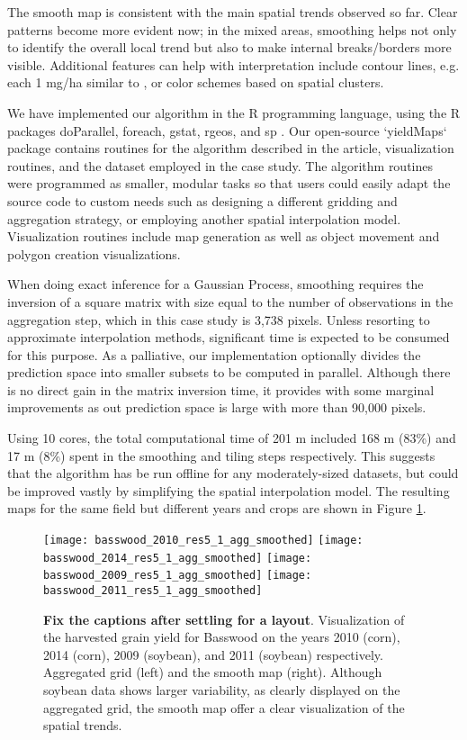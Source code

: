  The smooth map is consistent with
the main spatial trends observed so far. Clear patterns become more
evident now; in the mixed areas, smoothing helps not only to identify
the overall local trend but also to make internal breaks/borders more
visible. Additional features can help with interpretation include
contour lines, e.g. each 1 mg/ha similar to \cite{Blackmore1999}, or
color schemes based on spatial clusters.

We have implemented our algorithm in the R programming language, using
the R packages doParallel, foreach, gstat, rgeos, and sp
\citep{Pebesma2004, Pebesma2005, Bivand2013, Graeler2016,
  Microsoft2017, Corporation2018, RCT2019, Bivand2019}. Our open-source
`yieldMaps` package contains routines for the algorithm described in
the article, visualization routines, and the dataset employed in the
case study. The algorithm routines were programmed as smaller, modular
tasks so that users could easily adapt the source code to custom needs
such as designing a different gridding and aggregation strategy, or
employing another spatial interpolation model. Visualization routines
include map generation as well as object movement and polygon creation
visualizations.

When doing exact inference for a Gaussian Process, smoothing requires
the inversion of a square matrix with size equal to the number of
observations in the aggregation step, which in this case study is
3,738 pixels. Unless resorting to approximate interpolation methods,
significant time is expected to be consumed for this purpose. As a
palliative, our implementation optionally divides the prediction space
into smaller subsets to be computed in parallel. Although there is no
direct gain in the matrix inversion time, it provides with some
marginal improvements as out prediction space is large with more than
90,000 pixels.

Using 10 cores, the total computational time of 201 m included 168 m
(83\%) and 17 m (8\%) spent in the smoothing and tiling steps
respectively. This suggests that the algorithm has be run offline for
any moderately-sized datasets, but could be improved vastly by
simplifying the spatial interpolation model. The resulting maps for
the same field but different years and crops are shown in Figure
\ref{fig:basswood-history}.

\begin{figure}[h!]  \centering
  \texttt{[image: basswood\_2010\_res5\_1\_agg\_smoothed]}
  \texttt{[image: basswood\_2014\_res5\_1\_agg\_smoothed]}
  \texttt{[image: basswood\_2009\_res5\_1\_agg\_smoothed]}
  \texttt{[image: basswood\_2011\_res5\_1\_agg\_smoothed]}
  \caption{\textbf{Fix the captions after settling for a
      layout}. Visualization of the harvested grain yield for Basswood on
    the years 2010 (corn), 2014 (corn), 2009 (soybean), and 2011 (soybean)
    respectively. Aggregated grid (left) and the smooth map
    (right). Although soybean data shows larger variability, as clearly
    displayed on the aggregated grid, the smooth map offer a clear
    visualization of the spatial trends.}
  \label{fig:basswood-history}
\end{figure}
